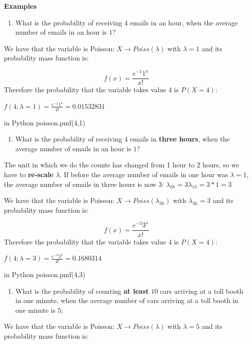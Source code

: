 \documentclass[
]{book}
\providecommand{\tightlist}{%
  \setlength{\itemsep}{0pt}\setlength{\parskip}{0pt}}
\begin{document}
\textbf{Examples}

\begin{enumerate}
\def\labelenumi{\arabic{enumi})}
\tightlist
\item
  What is the probability of receiving 4 emails in an hour, when the average number of emails in an hour is \(1\)?
\end{enumerate}

We have that the variable is Poisson: \(X \rightarrow Poiss(\lambda)\) with \(\lambda=1\) and its probability mass function is:

\[f(x)= \frac{e^{-1}1^x}{x!}\]
Therefore the probability that the variable takes value 4 is \(P(X=4)\):

\(f(4; \lambda=1)= \frac{e^{-1}1^4}{4!}=0.01532831\)

in Python poisson.pmf(4,1)

\begin{enumerate}
\def\labelenumi{\arabic{enumi})}
\setcounter{enumi}{1}
\tightlist
\item
  What is the probability of receiving 4 emails in \textbf{three hours}, when the average number of emails in an hour is \(1\)?
\end{enumerate}

The unit in which we do the counts has changed from 1 hour to 2 hours, so we have to \textbf{re-scale} \(\lambda\). If before the average number of emails in one hour was \(\lambda=1\), the average number of emails in three hours is now 3: \(\lambda_{3h}=3\lambda_{1h}=3*1=3\)

We have that the variable is Poisson: \(X \rightarrow Poiss(\lambda_{3h})\) with \(\lambda_{3h}=3\) and its probability mass function is:

\[f(x)= \frac{e^{-3}3^x}{x!}\]
Therefore the probability that the variable takes value 4 is \(P(X=4)\):

\(f(4; \lambda=3)= \frac{e^{-3}3^4}{4!}=0.1680314\)

in Python poisson.pmf(4,3)

\begin{enumerate}
\def\labelenumi{\arabic{enumi})}
\setcounter{enumi}{2}
\tightlist
\item
  What is the probability of counting \textbf{at least} \(10\) cars arriving at a toll booth in one minute, when the average number of cars arriving at a toll booth in one minute is \(5\);
\end{enumerate}

We have that the variable is Poisson: \(X \rightarrow Poiss(\lambda)\) with \(\lambda=5\) and its probability mass function is:
\end{document}
